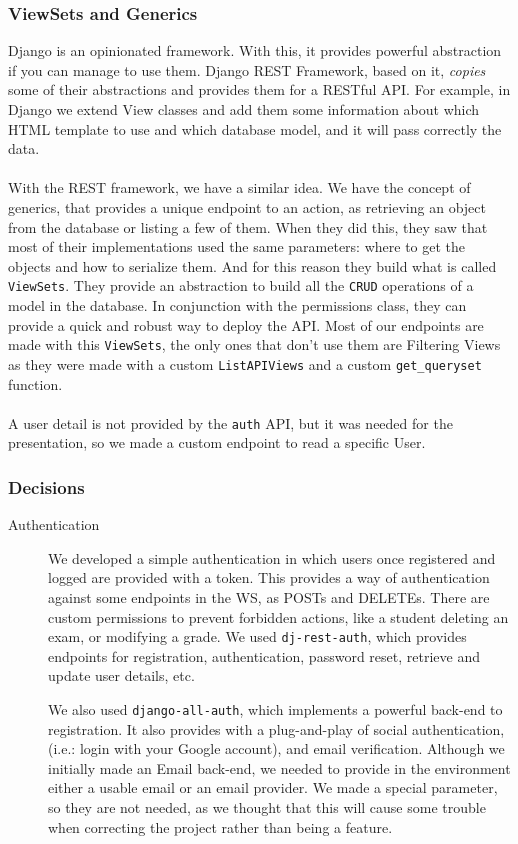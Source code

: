 \documentclass[11pt]{article}
\begin{document}
\subsubsection{ViewSets and Generics}
\label{sec:org512aace}
Django is an opinionated framework. With this, it provides powerful
abstraction if you can manage to use them. Django REST Framework, based
on it, \emph{copies} some of their abstractions and provides them for a
RESTful API. For example, in Django we extend View classes and add them
some information about which HTML template to use and which database
model, and it will pass correctly the data.\\
\\
With the REST framework, we have a similar idea. We have the concept of
generics, that provides a unique endpoint to an action, as retrieving an
object from the database or listing a few of them. When they did this,
they saw that most of their implementations used the same parameters:
where to get the objects and how to serialize them. And for this reason
they build what is called \texttt{ViewSets}. They provide an abstraction
to build all the \texttt{CRUD} operations of a model in the database. In
conjunction with the permissions class, they can provide a quick and
robust way to deploy the API. Most of our endpoints are made with this
\texttt{ViewSets}, the only ones that don't use them are
Filtering Views as they were made with a custom \texttt{ListAPIViews}  and a custom \texttt{get\_queryset} function.\\
\\
A user detail is not provided by the \texttt{auth} API, but it was needed for the 
presentation, so we made a custom endpoint to read a specific User.

\subsubsection{Decisions}
\label{sec:org0ef4455}

\begin{description}
\item[{Authentication}] We developed a simple authentication in which users
once registered and logged are provided with a token. This  provides
a way of authentication against some endpoints in the WS, as POSTs and DELETEs. 
There are custom permissions to prevent forbidden actions, like a student deleting an 
exam, or modifying a grade. We used \texttt{dj-rest-auth}, which provides endpoints for
registration, authentication, password reset, retrieve and update
user details, etc.

We also used \texttt{django-all-auth}, which implements a powerful back-end to
registration. It also provides with a plug-and-play of social
authentication, (i.e.: login with your Google account), and email
verification. Although we initially made an Email back-end, we needed
to provide in the environment either a usable email or an email
provider. We made a special parameter, so they are not needed, as we
thought that this will cause some trouble when correcting the project
rather than being a feature.
\end{description}
\end{document}
